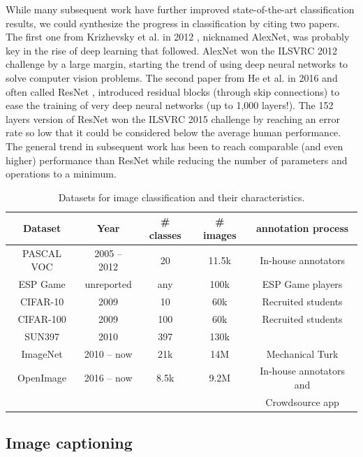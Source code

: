 While many subsequent work have further improved state-of-the-art classification results, we could synthesize the progress in classification by citing two papers. The first one from Krizhevsky et al. in 2012 \cite{krizhevsky2012imagenet}, nicknamed AlexNet, was probably key in the rise of deep learning that followed. AlexNet won the ILSVRC 2012 challenge by a large margin, starting the trend of using deep neural networks to solve computer vision problems. The second paper from He et al. in 2016 and often called ResNet \cite{he2016deep}, introduced residual blocks (through skip connections) to ease the training of very deep neural networks (up to 1,000 layers!). The 152 layers version of ResNet won the ILSVRC 2015 challenge by reaching an error rate so low that it could be considered below the average human performance. The general trend in subsequent work has been to reach comparable (and even higher) performance than ResNet while reducing the number of parameters and operations to a minimum.  

\vspace{0.5cm}
\begin{table}
	\centering
	\caption{Datasets for image classification and their characteristics.}
	\begin{tabular}{|c|c|c|c|c|}
		\hline
		Dataset & Year & \# classes & \# images &  annotation process \\
		\hline
		PASCAL VOC \cite{Everingham10} & 2005 -- 2012 & 20 & 11.5k &  In-house annotators \\
		ESP Game \cite{von2005esp} & unreported & any & 100k &  ESP Game players \\
		CIFAR-10 \cite{krizhevsky2009learning} & 2009 & 10 & 60k  & Recruited students \\
		CIFAR-100 \cite{krizhevsky2009learning} & 2009 & 100 & 60k  & Recruited students \\
		SUN397 \cite{xiao2010sun} & 2010 & 397 & 130k &   \\
		ImageNet \cite{ILSVRC15} & 2010 -- now & 21k & 14M &  Mechanical Turk \\
		OpenImage \cite{OpenImages, OpenImages2} & 2016 -- now & 8.5k & 9.2M &  In-house annotators and \\
& & & & Crowdsource app\\
		\hline
	\end{tabular}
	\label{tab:classification_ds}
\end{table}
\vspace{0.5cm}

\subsection{Image captioning}

